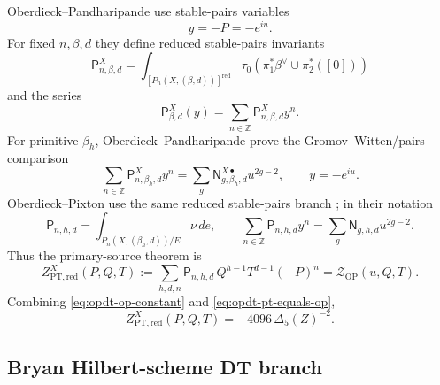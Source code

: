 Oberdieck--Pandharipande use stable-pairs variables
\begin{equation}
\label{eq:opdt-opand-pair-vars}
y=-P=-e^{iu}.
\end{equation}
For fixed \(n,\beta,d\) they define reduced stable-pairs invariants
\begin{equation}
\label{eq:opdt-pair-invariant}
\mathsf P^X_{n,\beta,d}
=
\int_{[P_n(X,(\beta,d))]^{\mathrm{red}}}
\tau_0\!\left(\pi_1^*\beta^\vee\cup\pi_2^*([0])\right)
\end{equation}
and the series
\begin{equation}
\label{eq:opdt-pair-series-fixed}
\mathsf P^X_{\beta,d}(y)
=
\sum_{n\in\mathbb Z}\mathsf P^X_{n,\beta,d}y^n.
\end{equation}
For primitive \(\beta_h\), Oberdieck--Pandharipande prove the
Gromov--Witten/pairs comparison \cite[Proposition after Conjecture D]{OPand}
\begin{equation}
\label{eq:opdt-gw-pair}
\sum_{n\in\mathbb Z}\mathsf P^X_{n,\beta_h,d}y^n
=
\sum_g\mathsf N^{X\bullet}_{g,\beta_h,d}u^{2g-2},
\qquad
y=-e^{iu}.
\end{equation}
Oberdieck--Pixton use the same reduced stable-pairs branch
\cite[\S4.7]{OB}; in their notation
\begin{equation}
\label{eq:opdt-op-pt}
\mathsf P_{n,h,d}
=
\int_{P_n(X,(\beta_h,d))/E}\nu\,de,
\qquad
\sum_{n\in\mathbb Z}\mathsf P_{n,h,d}y^n
=
\sum_g\mathsf N_{g,h,d}u^{2g-2}.
\end{equation}
Thus the primary-source theorem is
\begin{equation}
\label{eq:opdt-pt-equals-op}
Z^X_{\mathrm{PT,red}}(P,Q,T)
:=
\sum_{h,d,n}\mathsf P_{n,h,d}\,Q^{h-1}T^{d-1}(-P)^n
=
\mathcal Z_{\mathrm{OP}}(u,Q,T).
\end{equation}
Combining \eqref{eq:opdt-op-constant} and
\eqref{eq:opdt-pt-equals-op},
\begin{equation}
\label{eq:opdt-pt-constant}
Z^X_{\mathrm{PT,red}}(P,Q,T)
=-4096\,\Delta_5(Z)^{-2}.
\end{equation}

\subsection{Bryan Hilbert-scheme DT branch}

